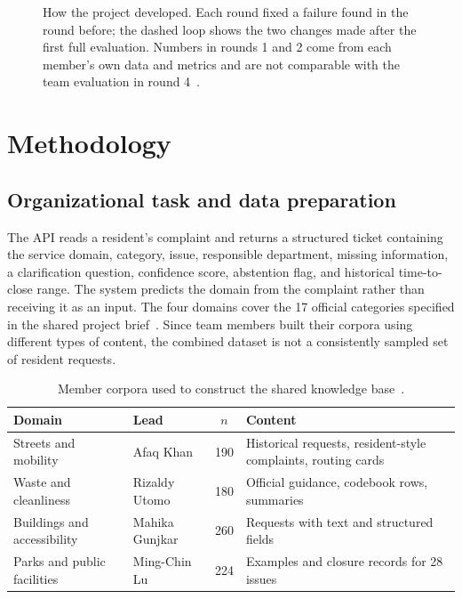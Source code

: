 \documentclass[11pt,letterpaper]{article}
\begin{document}
\begin{figure}[htbp]
\caption{How the project developed. Each round fixed a failure found in the round before; the dashed loop shows the two changes made after the first full evaluation. Numbers in rounds 1 and 2 come from each member's own data and metrics and are not comparable with the team evaluation in round 4~\cite{team}.}
\label{fig:iteration}
\end{figure}

\section{Methodology}

\subsection{Organizational task and data preparation}

The API reads a resident's complaint and returns a structured ticket containing the service domain, category, issue, responsible department, missing information, a clarification question, confidence score, abstention flag, and historical time-to-close range. The system predicts the domain from the complaint rather than receiving it as an input. The four domains cover the 17 official categories specified in the shared project brief~\cite{team}. Since team members built their corpora using different types of content, the combined dataset is not a consistently sampled set of resident requests.

\begin{table}[htbp]
\centering
\caption{Member corpora used to construct the shared knowledge base~\cite{archive}.}
\label{tab:corpora}
\begin{tabularx}{\textwidth}{@{}l l r L@{}}
\toprule
Domain & Lead &  & Content \\
\midrule
Streets and mobility & Afaq Khan & 190 & Historical requests, resident-style complaints, routing cards \\
Waste and cleanliness & Rizaldy Utomo & 180 & Official guidance, codebook rows, summaries \\
Buildings and accessibility & Mahika Gunjkar & 260 & Requests with text and structured fields \\
Parks and public facilities & Ming-Chin Lu & 224 & Examples and closure records for 28 issues \\
\bottomrule
\end{tabularx}
\end{table}
\end{document}
